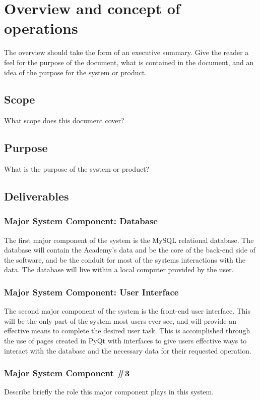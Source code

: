 
\chapter{Overview and concept of operations}

The overview should take the form of an executive summary.  Give the reader a feel 
for the purpose of the document, what is contained in the document, and an idea 
of the purpose for the system or product. 


\section{Scope}
What scope does this document cover? 


\section{Purpose}
What is the purpose of the system or product?

\section{Deliverables} 

\subsection{Major System Component: Database}
The first major component of the system is the MySQL relational database. The database will contain the Academy's data and be the core of the back-end side of the software, and be the conduit for most of the systems interactions with the data. The database will live within a local computer provided by the user.  

\subsection{Major System Component: User Interface}
The second major component of the system is the front-end user interface. This will be the only part of the system most users ever see, and will provide an effective means to complete the desired user task. This is accomplished through the use of pages created in PyQt with interfaces to give users effective ways to interact with the database and the necessary data for their requested operation.

\subsection{Major System Component \#3}
Describe briefly the role this major component plays in this system. 

